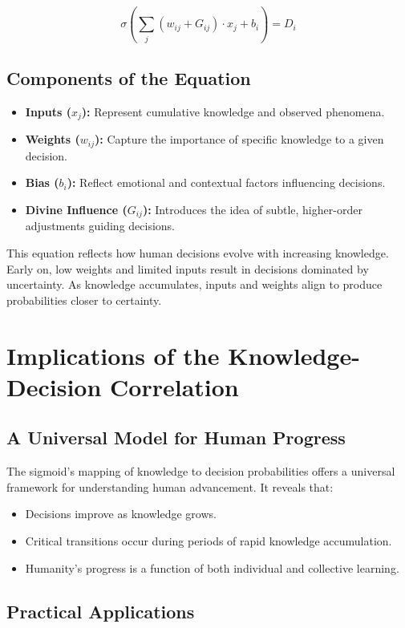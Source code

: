 \documentclass[a4]{article}
\begin{document}
$$
\sigma \left(\sum_j (w_{ij} + G_{ij}) \cdot x_j + b_i \right) = D_i 
$$

\subsection*{Components of the Equation}

\begin{itemize}
\item  {\bf Inputs ($x_j$):}  Represent cumulative knowledge and observed phenomena.
\item  {\bf Weights ($w_{ij}$):}  Capture the importance of specific knowledge to a given decision.
\item {\bf Bias ($b_i$):}  Reflect emotional and contextual factors influencing decisions.
\item {\bf Divine Influence ($G_{ij}$):}  Introduces the idea of subtle, higher-order adjustments guiding decisions.
\end{itemize}

This equation reflects how human decisions evolve with increasing knowledge. Early on, low weights and limited inputs result in decisions dominated by uncertainty. As knowledge accumulates, inputs and weights align to produce probabilities closer to certainty.

\section{Implications of the Knowledge-Decision Correlation}

\subsection{A Universal Model for Human Progress}

The sigmoid's mapping of knowledge to decision probabilities offers a universal framework for understanding human advancement. It reveals that:

\begin{itemize}
\item  Decisions improve as knowledge grows.
\item Critical transitions occur during periods of rapid knowledge accumulation.
\item Humanity's progress is a function of both individual and collective learning.
\end{itemize}

\subsection{Practical Applications}
\end{document}
